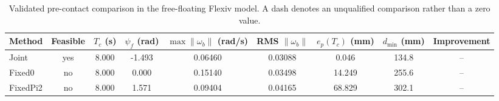 \begin{table}[t]
\centering
\caption{Validated pre-contact comparison in the free-floating Flexiv model. A dash denotes an unqualified comparison rather than a zero value.}
\label{tab:precontact_comparison}
\begin{tabular}{lcccccccc}
\toprule
Method & Feasible & $T_c$ (s) & $\psi_f$ (rad) & $\max\|\omega_b\|$ (rad/s) & RMS $\|\omega_b\|$ & $e_p(T_c)$ (mm) & $d_{\min}$ (mm) & Improvement \\
\midrule
Joint & yes & 8.000 & -1.493 & 0.06460 & 0.03088 & 0.046 & 134.8 & -- \\
Fixed0 & no & 8.000 & 0.000 & 0.15140 & 0.03498 & 14.249 & 255.6 & -- \\
FixedPi2 & no & 8.000 & 1.571 & 0.09404 & 0.04165 & 68.829 & 302.1 & -- \\
\bottomrule
\end{tabular}
\end{table}
